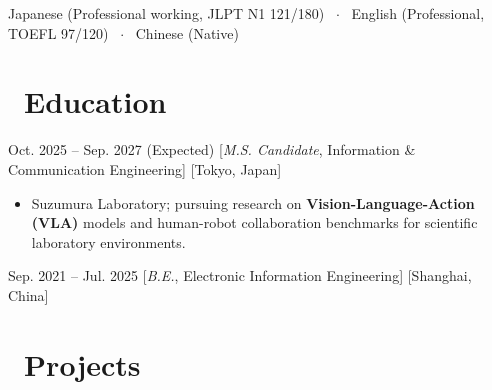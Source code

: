 \documentclass{resume}
\newcommand{\projectgap}{\vspace{0.55em}}
\begin{document}
\begin{basicinfo}
\end{basicinfo}

\projectgap
\noindent Japanese (Professional working, JLPT N1 121/180) \, $\cdot$ \, English (Professional, TOEFL 97/120) \, $\cdot$ \, Chinese (Native)

\section{\texorpdfstring{\faGraduationCap\ }{}\textbf{Education}}

{Oct. 2025 -- Sep. 2027 (Expected)}
[\textit{M.S. Candidate}, Information \& Communication Engineering]
[Tokyo, Japan]
\begin{itemize}
	\item Suzumura Laboratory; pursuing research on \textbf{Vision-Language-Action (VLA)} models and human-robot collaboration benchmarks for scientific laboratory environments.
\end{itemize}

{Sep. 2021 -- Jul. 2025}
[\textit{B.E.}, Electronic Information Engineering]
[Shanghai, China]

\section{\texorpdfstring{\faProjectDiagram\ }{}\textbf{Projects}}
\end{document}
